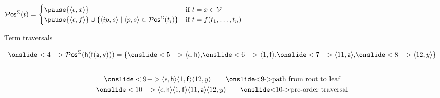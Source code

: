 

\begin{definition}
$
	\PosStr(t) =  
	\begin{cases}
\pause		\{ \ANGLES{\epsilon,x} \} & \text{if }t=x\in\SIGV \\
\pause		\{ \ANGLES{\epsilon, f} \} \cup \{ \ANGLES{ip,s}\mid \ANGLES{p,s} \in\PosStr(t_i)\} &
		\text{if }t=f(t_1,\ldots,t_n)
	\end{cases}
$
\end{definition}

%
\pause
\begin{block}{Term traversals}
	\vspace{-0.5em}
\begin{minipage}[c]{3cm}
\end{minipage}
%
\begin{minipage}[c]{8.5cm}
	\begin{gather*}
		\onslide<4->{
			\PosStr(\mh(\mf(\ma,\my))) = \{ 
		\onslide<5->{ \ANGLES{\epsilon,\mh}, 
			}}
		\onslide<6->{ \ANGLES{1,\mf}, }
		\onslide<7->{ \ANGLES{11,\ma}, }
		\onslide<8->{ \ANGLES{12,y} }
		\} \\[2em]
		\onslide<9->{\ANGLES{\epsilon,\mh}\ANGLES{1,\mf}\ANGLES{12,y}
			\tag*{\onslide<9->{path from root to leaf}} 
		}			\\
		\onslide<10->{\ANGLES{\epsilon,\mh}\ANGLES{1,\mf}\ANGLES{11,\ma}\ANGLES{12,y}
			\tag*{\onslide<10->{pre-order traversal}} 
		}
		\\
	\end{gather*}
\end{minipage}
\end{block}
